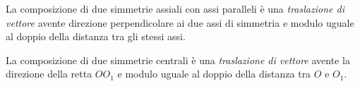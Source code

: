 \begin{definizione}
La composizione di due simmetrie assiali con assi paralleli è una \emph{traslazione di vettore} avente direzione perpendicolare ai due assi di simmetria e modulo uguale al doppio della distanza tra gli stessi assi.
\end{definizione}
			
\begin{comment}			
88   Verificate che la traslazione  è caratterizzata da un vettore avente modulo e direzione uguali al vettore  trovato nell’esercizio precedente, ma verso opposto.
89   Nel riferimento cartesiano ortogonale sono assegnati i punti A(1,5); B(2,1); C(-1,3). Determinate i punti A”, B”, C” immagine rispettivamente di A, B, C nella traslazione . Scrivete  l’equazione della traslazione, individuate il vettore che la definisce calcolandone modulo e direzione. 
90   Determinate i vettori  delle traslazioni  e il vettore . Verificate che . 
Cosa otteniamo dalla composizione ? Sapresti darne la motivazione?
Concludete: componendo due traslazioni si ottiene ……………………………………….
91   Nel riferimento cartesiano ortogonale Oxy è assegnato il punto ; scrivete l’equazione della simmetria centrale di centro O  e l’equazione della simmetria centrale di centro  . Determinate l’immagine P” del punto  nell’isometria  di cui avrete scritto l’equazione e determinate . Determinate Q” immagine di nell’isometria  e determinate . Potete affermare che ? Verificate che .
			
92   è vero che  sono la stessa isometria?
93   Dimostrate che la composizione di due simmetrie centrali è una traslazione caratterizzata dal vettore parallelo alla retta passante per i due centri e modulo uguale al doppio della loro distanza.
\end{comment}			
			
\begin{definizione}
La composizione di due simmetrie centrali è una \emph{traslazione di vettore} avente la direzione della retta $OO_1$ e modulo uguale al doppio della distanza tra $O$ e $O_1$.
\end{definizione}
			
\begin{comment}			
94   Composizione di due simmetrie assiali con assi paralleli.
Prima simmetria ; Seconda simmetria 
Componendo le due simmetrie si ha  che è … … … … … … … … … 
Se a=b le due simmetrie sono … … … … … … … … … … la loro composizione è … … … … … …
95   Composizione di due simmetrie assiali con assi perpendicolari.
Una simmetria con asse parallelo all’asse y ha equazione  e asse x = a 
Mentre una simmetria con asse parallelo all’asse x ha equazione   e asse y = b 
Componendo le due simmetrie otteniamo … …   
\end{comment}			
			
